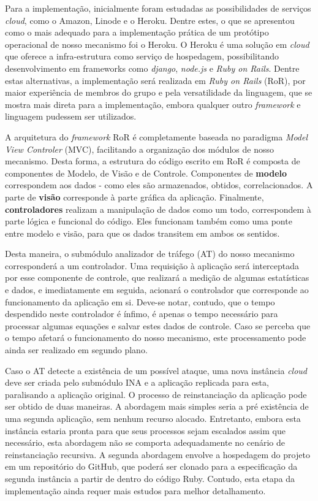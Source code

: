Para a implementação, inicialmente foram estudadas as possibilidades de serviços \emph{cloud}, como o Amazon, Linode e o Heroku. Dentre estes, o que se apresentou como o mais adequado para a implementação prática de um protótipo operacional de nosso mecanismo foi o Heroku. O Heroku é uma solução em \emph{cloud} que oferece a infra-estrutura como serviço de hospedagem, possibilitando desenvolvimento em frameworks como \emph{django}, \emph{node.js} e \emph{Ruby on Rails}. Dentre estas alternativas, a implementação será realizada em \emph{Ruby on Rails} (RoR), por maior experiência de membros do grupo e pela versatilidade da linguagem, que se mostra mais direta para a implementação, embora qualquer outro \emph{framework} e linguagem pudessem ser utilizados.

A arquitetura do \emph{framework} RoR é completamente baseada no paradigma \emph{Model View Controler} (MVC), facilitando a organização dos módulos de nosso mecanismo. Desta forma, a estrutura do código escrito em RoR é composta de componentes de Modelo, de Visão e de Controle. Componentes de \textbf{modelo} correspondem aos dados - como eles são armazenados, obtidos, correlacionados. A parte de \textbf{visão} corresponde à parte gráfica da aplicação. Finalmente, \textbf{controladores} realizam a manipulação de dados como um todo, correspondem à parte lógica e funcional do código. Eles funcionam também como uma ponte entre modelo e visão, para que os dados transitem em ambos os sentidos.

Desta maneira, o submódulo analizador de tráfego (AT) do nosso mecanismo corresponderá a um controlador. Uma requisição à aplicação será interceptada por esse componente de controle, que realizará a medição de algumas estatísticas e dados, e imediatamente em seguida, acionará o controlador que corresponde ao funcionamento da aplicação em si. Deve-se notar, contudo, que o tempo despendido neste controlador é ínfimo, é apenas o tempo necessário para processar algumas equações e salvar estes dados de controle. Caso se perceba que o tempo afetará o funcionamento do nosso mecanismo, este processamento pode ainda ser realizado em segundo plano.

Caso o AT detecte a existência de um possível ataque, uma nova instância \emph{cloud} deve ser criada pelo submódulo INA e a aplicação replicada para esta, paralisando a aplicação original. O processo de reinstanciação da aplicação pode ser obtido de duas maneiras. A abordagem mais simples seria a pré existência de uma segunda aplicação, sem nenhum recurso alocado. Entretanto, embora esta instância estaria pronta para que seus processos sejam escalados assim que necessário, esta abordagem não se comporta adequadamente no cenário de reinstanciação recursiva. A segunda abordagem envolve a hospedagem do projeto em um repositório do GitHub, que poderá ser clonado para a especificação da segunda instância a partir de dentro do código Ruby. Contudo, esta etapa da implementação ainda requer mais estudos para melhor detalhamento.

